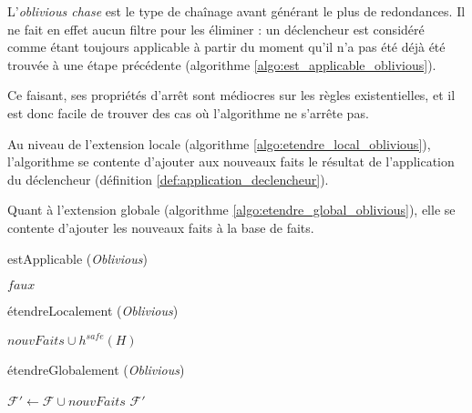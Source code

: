 L'\textit{oblivious chase} est le type de chaînage avant générant le plus de redondances. Il ne fait en effet aucun filtre pour les éliminer : un déclencheur est considéré comme étant toujours applicable à partir du moment qu'il n'a pas été déjà été trouvée à une étape précédente (algorithme \ref{algo:est_applicable_oblivious}).
\par Ce faisant, ses propriétés d'arrêt sont médiocres sur les règles existentielles, et il est donc facile de trouver des cas où l'algorithme ne s'arrête pas.
\par Au niveau de l'extension locale (algorithme \ref{algo:etendre_local_oblivious}), l'algorithme se contente d'ajouter aux nouveaux faits le résultat de l'application du déclencheur (définition \ref{def:application_declencheur}).
\par Quant à l'extension globale (algorithme \ref{algo:etendre_global_oblivious}), elle se contente d'ajouter les nouveaux faits à la base de faits.


\begin{algorithm}[!h]\label{algo:est_applicable_oblivious}
\caption{estApplicable (\textit{Oblivious})}
\SetAlgoLined
\DontPrintSemicolon
{}
{
    \Return $faux$
}
\end{algorithm}

\begin{algorithm}[H]\label{algo:etendre_local_oblivious}
\caption{étendreLocalement (\textit{Oblivious})}
\SetAlgoLined
\DontPrintSemicolon
{}
    \Return $nouvFaits \cup h^{safe}(H)$ 
\end{algorithm}

\begin{algorithm}[H]\label{algo:etendre_global_oblivious}
\caption{étendreGlobalement (\textit{Oblivious})}
\SetAlgoLined
\DontPrintSemicolon
{}
    $\mathcal{F'} \gets \mathcal{F} \cup nouvFaits$\;
    \Return $\mathcal{F'}$
\end{algorithm}

